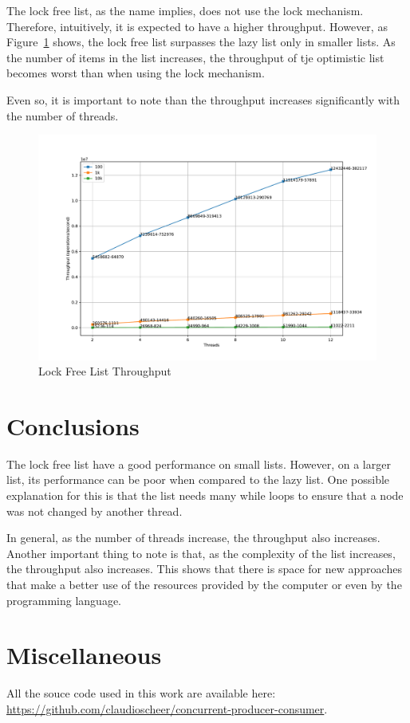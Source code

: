 \documentclass{article}
\begin{document}
The lock free list, as the name implies, does not use the lock mechanism. Therefore, intuitively, it is expected to have a higher throughput. However, as Figure~\ref{fig:lock-free-throughput} shows, the lock free list surpasses the lazy list only in smaller lists. As the number of items in the list increases, the throughput of tje optimistic list becomes worst than when using the lock mechanism.

Even so, it is important to note than the throughput increases significantly with the number of threads.

\begin{figure}[H]
    \centering
    \includegraphics[width=\textwidth]{../test/plots/LockFreeListThroughput.pdf}
    \caption{Lock Free List Throughput}
    \label{fig:lock-free-throughput}
\end{figure}


\section{Conclusions}

The lock free list have a good performance on small lists. However, on a larger list, its performance can be poor when compared to the lazy list. One possible explanation for this is that the list needs many while loops to ensure that a node was not changed by another thread.

In general, as the number of threads increase, the throughput also increases. Another important thing to note is that, as the complexity of the list increases, the throughput also increases. This shows that there is space for new approaches that make a better use of the resources provided by the computer or even by the programming language.


\section{Miscellaneous} \label{sec:miscellaneous}

All the souce code used in this work are available here: \url{https://github.com/claudioscheer/concurrent-producer-consumer}.
\end{document}
